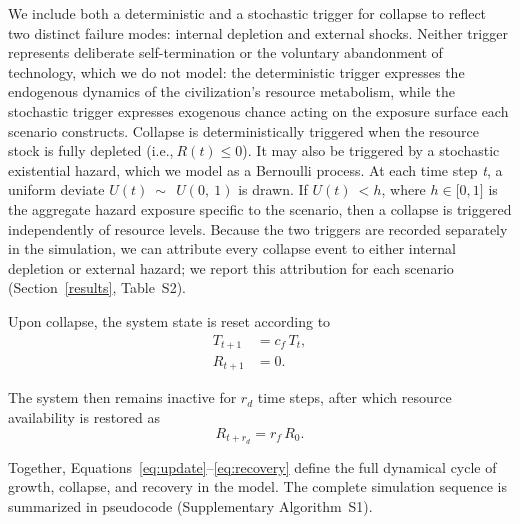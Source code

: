We include both a deterministic and a stochastic trigger for collapse to reflect two distinct failure modes: internal depletion and external shocks. Neither trigger represents deliberate self-termination or the voluntary abandonment of technology, which we do not model: the deterministic trigger expresses the endogenous dynamics of the civilization's resource metabolism, while the stochastic trigger expresses exogenous chance acting on the exposure surface each scenario constructs. Collapse is deterministically triggered when the resource stock is fully depleted (i.e.,\(\ R(t) \leq 0\)). It may also be triggered by a stochastic existential hazard, which we model as a Bernoulli process. At each time step \emph{t}, a uniform deviate \(U(t)\ \sim\ \ U(0,\ 1)\) is drawn. If \(U(t)\  < h\), where \(h \in \lbrack 0,1\rbrack\) is the aggregate hazard exposure specific to the scenario, then a collapse is triggered independently of resource levels. Because the two triggers are recorded separately in the simulation, we can attribute every collapse event to either internal depletion or external hazard; we report this attribution for each scenario (Section~\ref{results}, Table~S2).

Upon collapse, the system state is reset according to
\begin{equation}
\begin{aligned}
T_{t+1} &= c_f \, T_t ,\\
R_{t+1} &= 0 .
\end{aligned}
\label{eq:collapse}
\end{equation}

The system then remains inactive for $r_d$ time steps, after which resource availability is restored as
\begin{equation}
R_{t+r_d} = r_f \, R_0 .
\label{eq:recovery}
\end{equation}

Together, Equations~\eqref{eq:update}--\eqref{eq:recovery} define the full dynamical cycle of growth, collapse, and recovery in the model. The complete simulation sequence is summarized in pseudocode (Supplementary Algorithm~S1).


